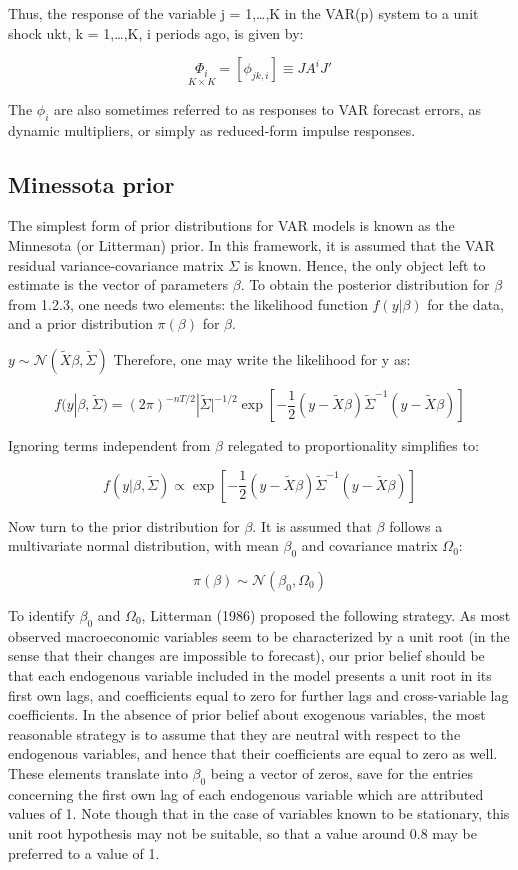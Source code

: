 \documentclass[
]{article}
\begin{document}
Thus, the response of the variable j = 1,\ldots,K in the VAR(p) system to a unit
shock ukt, k = 1,\ldots,K, i periods ago, is given by:

\[ \underset{K×K}{\Phi_i} = [\phi_{jk,i}] ≡ JA^iJ'\]

The \(\phi_i\) are also sometimes referred to as responses to VAR forecast errors, as
dynamic multipliers, or simply as reduced-form impulse responses.

\hypertarget{minessota-prior}{%
\subsection{Minessota prior}\label{minessota-prior}}

The simplest form of prior distributions for VAR models is known as the Minnesota (or Litterman) prior. In this framework, it is assumed that the VAR residual variance-covariance matrix \(\Sigma\) is known. Hence, the only object left to estimate is the vector of parameters \(\beta\). To obtain the posterior distribution for \(\beta\) from 1.2.3, one needs two elements: the likelihood function \(f(y |\beta)\) for the data,
and a prior distribution \(\pi(\beta)\) for \(\beta\).

\(y\sim \mathcal{N}(\tilde{X}\beta, \tilde{\Sigma})\) Therefore, one may write the likelihood for y as:

\[f(y|\beta, \tilde{\Sigma}) = (2\pi)^{-nT/2} |\tilde{\Sigma}|^{-1/2}\exp[-\dfrac{1}{2}(y-\tilde{X}\beta)\tilde{\Sigma}^{-1}(y-\tilde{X}\beta)]\]

Ignoring terms independent from \(\beta\) relegated to proportionality simplifies to:

\[f(y|\beta, \tilde{\Sigma})\propto \exp[-\dfrac{1}{2}(y-\tilde{X}\beta)\tilde{\Sigma}^{-1}(y-\tilde{X}\beta)]\]

Now turn to the prior distribution for \(\beta\). It is assumed that \(\beta\) follows a multivariate normal distribution, with mean \(\beta_0\) and covariance matrix \(\Omega_0\):

\[\pi(\beta) \sim \mathcal{N}(\beta_0, \Omega_0)\]

To identify \(\beta_0\) and \(\Omega_0\), Litterman (1986) proposed the following strategy. As most observed macroeconomic variables seem to be characterized by a unit root (in the sense that their changes are impossible to forecast), our prior belief should be that each endogenous variable included in the model presents a unit root in its first own lags, and coefficients equal to zero for further lags and cross-variable lag coefficients. In the absence of prior belief about exogenous variables, the most reasonable strategy is to assume that they are neutral with respect to the endogenous variables, and hence that their coefficients are equal to zero as well. These elements translate into \(\beta_0\) being a vector of zeros, save for the entries concerning the first own lag of each endogenous variable which are attributed values of 1. Note though that in the case of variables known to be stationary, this unit root hypothesis may not be suitable, so that a value around 0.8 may be preferred to a value of 1.
\end{document}
